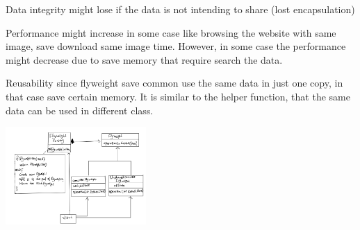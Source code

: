 \begin{nfps}
\item[Data integrity] might lose if the data is not intending to share (lost encapsulation)
\item[Performance] might increase in some case like browsing the website with same image, save download same image time. However, in some case the performance might decrease due to save memory that require search the data.
\item[Reusability] since flyweight save common use the same data in just one copy, in that case save certain memory. It is similar to the helper function, that the same data can be used in different class.
\end{nfps}

\begin{center}
    \includegraphics[width=0.4\textwidth]{./flyweight}
\end{center}

